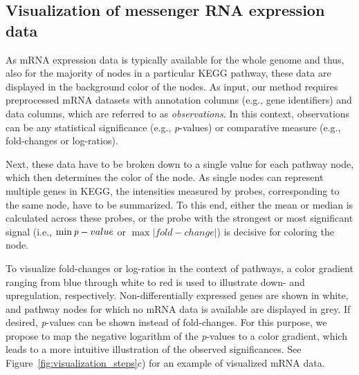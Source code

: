 \documentclass{bioinfo}
\begin{document}
\subsection{Visualization of messenger RNA expression data}

As mRNA expression data is typically available for the whole genome and thus, also for the majority
of nodes in a particular KEGG pathway, these data are displayed in the background color of the
nodes.
%
As input, our method requires preprocessed mRNA datasets with annotation columns (e.g.,
gene identifiers) and data columns, which are referred to as \emph{observations}. In this context,
observations can be any statistical significance (e.g., \emph{p}-values) or comparative measure
(e.g., fold-changes or log-ratios).

Next, these data have to be broken down to a single value for each pathway node, which then
determines the color of the node. As single nodes can represent multiple genes in KEGG, the
intensities measured by probes, corresponding to the same node, have to be summarized. To this end,
either the mean or median is calculated across these probes, or the probe
with the strongest or most significant signal (i.e., $\min\emph{p}-value$ or $\max|fold-change|$) is
decisive for coloring the node.

To visualize fold-changes or log-ratios in the context of pathways, a color gradient ranging from
blue through white to red is used to illustrate down- and upregulation,
respectively. Non-differentially expressed genes are shown in white, and pathway nodes for which no
mRNA data is available are displayed in grey. If desired, \emph{p}-values can be shown instead of
fold-changes. For this purpose, we propose to map the negative logarithm of the \emph{p}-values to a
color gradient, which leads to a more intuitive illustration of the observed significances.  See
Figure~\ref{fig:visualization_steps}c) for an example of visualized mRNA data.

\end{document}
